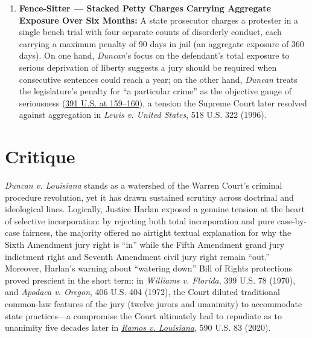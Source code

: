 \documentclass[12pt]{article}
\begin{document}
\begin{enumerate}
  \item \textbf{Fence-Sitter --- Stacked Petty Charges Carrying Aggregate Exposure Over Six Months:} A state prosecutor charges a protester in a single bench trial with four separate counts of disorderly conduct, each carrying a maximum penalty of 90 days in jail (an aggregate exposure of 360 days). On one hand, \textit{Duncan}'s focus on the defendant's total exposure to serious deprivation of liberty suggests a jury should be required when consecutive sentences could reach a year; on the other hand, \textit{Duncan} treats the legislature's penalty for ``a particular crime'' as the objective gauge of seriousness (\href{https://supreme.justia.com/cases/federal/us/391/145/}{391 U.S. at 159--160}), a tension the Supreme Court later resolved against aggregation in \textit{Lewis v. United States}, 518 U.S. 322 (1996).
\end{enumerate}

\section{Critique}

\textit{Duncan v. Louisiana} stands as a watershed of the Warren Court's criminal procedure revolution, yet it has drawn sustained scrutiny across doctrinal and ideological lines. Logically, Justice Harlan exposed a genuine tension at the heart of selective incorporation: by rejecting both total incorporation and pure case-by-case fairness, the majority offered no airtight textual explanation for why the Sixth Amendment jury right is ``in'' while the Fifth Amendment grand jury indictment right and Seventh Amendment civil jury right remain ``out.'' Moreover, Harlan's warning about ``watering down'' Bill of Rights protections proved prescient in the short term: in \textit{Williams v. Florida}, 399 U.S. 78 (1970), and \textit{Apodaca v. Oregon}, 406 U.S. 404 (1972), the Court diluted traditional common-law features of the jury (twelve jurors and unanimity) to accommodate state practices---a compromise the Court ultimately had to repudiate as to unanimity five decades later in \href{https://www.supremecourt.gov/opinions/19pdf/18-5924_n6io.pdf}{\textit{Ramos v. Louisiana}}, 590 U.S. 83 (2020).
\end{document}
